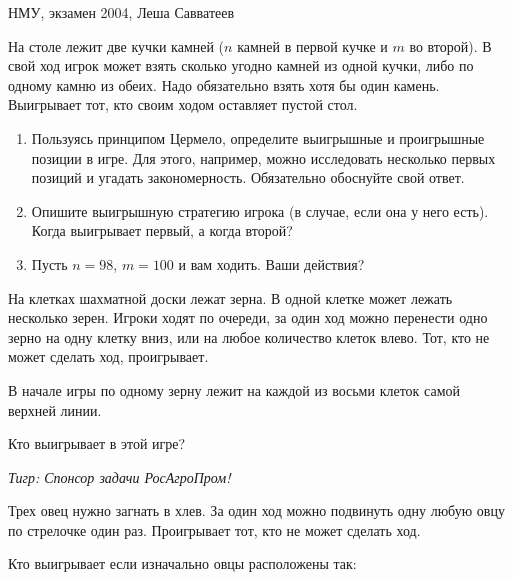 \begin{problem}
\begin{source}
НМУ, экзамен 2004, Леша Савватеев
\end{source}
  На столе лежит две кучки камней ($n$ камней в первой кучке и $m$ во второй). В свой ход игрок может взять сколько угодно камней из одной кучки, либо по одному камню из обеих. Надо обязательно взять хотя бы один камень. Выигрывает тот, кто своим ходом оставляет пустой стол.
\begin{enumerate}
\item Пользуясь принципом Цермело, определите выигрышные и проигрышные позиции в игре. Для этого, например, можно исследовать несколько первых позиций и угадать закономерность. Обязательно обоснуйте свой ответ.
\item Опишите выигрышную стратегию игрока (в случае, если она у него есть). Когда выигрывает первый, а когда второй?
\item Пусть $n = 98$, $m=100$ и вам ходить. Ваши действия?
\end{enumerate}






\begin{sol}

\end{sol}
\end{problem}



\begin{problem}
На клетках шахматной доски лежат зерна. В одной клетке может лежать несколько зерен. Игроки ходят по очереди, за один ход можно перенести одно зерно на одну клетку вниз, или на любое количество клеток влево. Тот, кто не может сделать ход, проигрывает.\par
В начале игры по одному зерну лежит на каждой из восьми клеток самой верхней линии.\par
Кто выигрывает в этой игре?\par
{\it Тигр: Спонсор задачи РосАгроПром!}



\begin{sol}

\end{sol}
\end{problem}




\begin{problem}
Трех овец нужно загнать в хлев. За один ход можно подвинуть одну любую овцу по стрелочке один раз. Проигрывает тот, кто не может сделать ход. \par
Кто выигрывает если изначально овцы расположены так:






\begin{sol}

\end{sol}
\end{problem}



